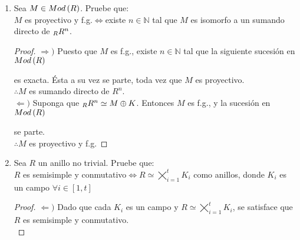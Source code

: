 \documentclass{article}
\begin{document}
\begin{enumerate}[label=\textbf{Ej \arabic*.}]
\begin{proof}
		Ahora, sea $\fntuple{\varphi}{i}{n} \in \displaystyle\coprod_{i=1}^{n}\ringmodhom{R}{\ringmod{R}{M_{i}}{l}}{\ringbimod{R}{S}{X}{lr}}$. Entonces cada $\varphi_{i}$ es un morfismo $\varphi_{i}:M_{i} \longrightarrow X$. Así, por la propiedad universal del coproducto, existe $\varphi:\displaystyle\coprod_{i=1}^{n}M_{i} \longrightarrow X$ tal que $\varphi\iota_{i}=\varphi_{i}$. De esta manera, $\rho\lrprth{\varphi}=\fntuple{\varphi}{i}{n}$. Por tanto, $\rho$ es un isomorfismo.\\
		$\therefore\ringmodhom{R}{\displaystyle\coprod_{i=1}^{n}M_{i}}{\ringbimod{R}{S}{X}{lr}}=\displaystyle\coprod_{i=1}^{n}\ringmodhom{R}{\ringmod{R}{M_{i}}{l}}{\ringbimod{R}{S}{X}{lr}}$
	\end{proof}
	
	\item Sea $M \in Mod\left(R\right)$. Pruebe que:\\
	$M$ es proyectivo y f.g.$\Leftrightarrow$existe $n\in\mathbb{N}$ tal que $M$ es isomorfo a un sumando directo de $\ringmod{R}{R^{n}}{l}$.
	\begin{proof}
		$\boxed{\Rightarrow )}$ Puesto que $M$ es f.g., existe $n\in\mathbb{N}$ tal que la siguiente sucesión en $Mod\left(R\right)$
		es exacta. Ésta a su vez se parte, toda vez que $M$ es proyectivo.\\
		$\therefore M$ es sumando directo de $R^{n}$.\\
		
		$\boxed{\Leftarrow )}$ Suponga que $\ringmod{R}{R^{n}}{l} \simeq M \oplus K$. Entonces $M$ es f.g., y la sucesión en $Mod\left(R\right)$
		se parte.\\
		$\therefore M$ es proyectivo y f.g.
	\end{proof}
	
	\item Sea $R$ un anillo no trivial. Pruebe que:\\
	$R$ es semisimple y conmutativo$\Leftrightarrow R \simeq \displaystyle\bigtimes_{i=1}^{t} K_{i}$ como anillos, donde $K_{i}$ es un campo $\forall i \in [1,t]$
	\begin{proof}
		$\boxed{\Leftarrow )}$ Dado que cada $K_{i}$ es un campo y $R \simeq \displaystyle\bigtimes_{i=1}^{t} K_{i}$, se satisface que $R$ es semisimple y conmutativo.\\
		

\end{proof}
\end{enumerate}
\end{document}
